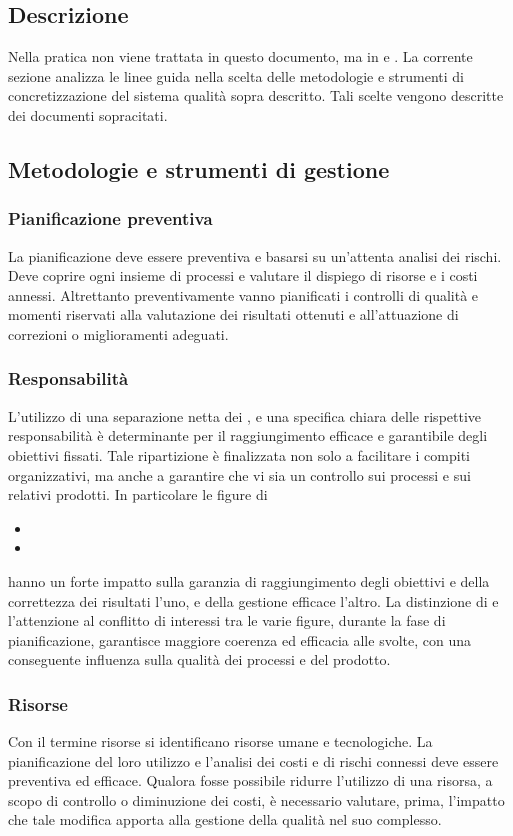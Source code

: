 \documentclass[12pt,a4paper]{article}
\begin{document}
\subsection{Descrizione}
Nella pratica non viene trattata in questo documento, ma in \PdP{} e \NdP{}. La corrente sezione analizza le linee guida nella scelta delle metodologie e strumenti di concretizzazione del sistema qualità sopra descritto. Tali scelte vengono descritte dei documenti sopracitati.

\subsection{Metodologie e strumenti di gestione}
\subsubsection{Pianificazione preventiva}
La pianificazione deve essere preventiva e basarsi su un'attenta analisi dei rischi. Deve coprire ogni insieme di processi e valutare il dispiego di risorse e i costi annessi. Altrettanto preventivamente vanno pianificati i controlli di qualità e momenti riservati alla valutazione dei risultati ottenuti e all'attuazione di correzioni o miglioramenti adeguati.

\subsubsection{Responsabilità}
L'utilizzo di una separazione netta dei , e una specifica chiara delle rispettive responsabilità è determinante per il raggiungimento efficace e garantibile degli obiettivi fissati.
Tale ripartizione è finalizzata non solo a facilitare i compiti organizzativi, ma anche a garantire che vi sia un controllo sui processi e sui relativi prodotti.
In particolare le figure di
\begin{itemize}
	\item {} 
	\item \RE
\end{itemize}
hanno un forte impatto sulla garanzia di raggiungimento degli obiettivi e della correttezza dei risultati l'uno, e della gestione efficace l'altro. La distinzione di  e l'attenzione al conflitto di interessi tra le varie figure, durante la fase di pianificazione, garantisce maggiore coerenza ed efficacia alle   svolte, con una conseguente influenza sulla qualità dei  processi e del prodotto.

\subsubsection{Risorse}\label{risorse}
Con il termine risorse si identificano risorse umane e tecnologiche. La pianificazione del loro utilizzo e l'analisi dei costi e di rischi connessi deve essere preventiva ed efficace. Qualora fosse possibile ridurre l'utilizzo di una risorsa, a scopo di controllo o diminuzione dei costi, è necessario valutare, prima, l'impatto che tale modifica apporta alla gestione della qualità nel suo complesso.
\end{document}
